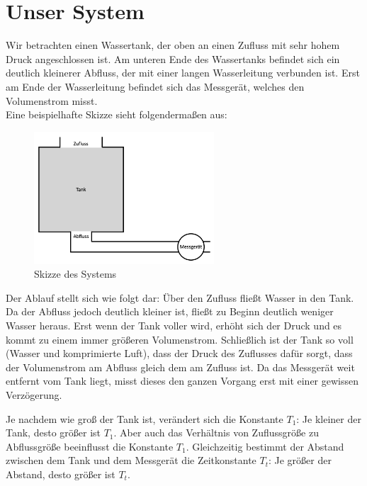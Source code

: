\section{Unser System}
Wir betrachten einen Wassertank, der oben an einen Zufluss mit sehr hohem Druck angeschlossen ist. Am unteren Ende des Wassertanks befindet sich ein deutlich kleinerer Abfluss, der mit einer langen Wasserleitung verbunden ist. Erst am Ende der Wasserleitung befindet sich das Messgerät, welches den Volumenstrom misst. \\
Eine beispielhafte Skizze sieht folgendermaßen aus:
\begin{figure}[H]
    \label{fig:tank}
    \centering
    \includegraphics[width=0.6\textwidth]{Bilder/Tank.png}
    \caption{Skizze des Systems}
 \end{figure}
Der Ablauf stellt sich wie folgt dar: Über den Zufluss fließt Wasser in den Tank. Da der Abfluss jedoch deutlich kleiner ist, fließt zu Beginn deutlich weniger Wasser heraus. Erst wenn der Tank voller wird, erhöht sich der Druck und es kommt zu einem immer größeren Volumenstrom. Schließlich ist der Tank so voll (Wasser und komprimierte Luft), dass der Druck des Zuflusses dafür sorgt, dass der Volumenstrom am Abfluss gleich dem am Zufluss ist. Da das Messgerät weit entfernt vom Tank liegt, misst dieses den ganzen Vorgang erst mit einer gewissen Verzögerung.

Je nachdem wie groß der Tank ist, verändert sich die Konstante $T_1$: Je kleiner der Tank, desto größer ist $T_1$. Aber auch das Verhältnis von Zuflussgröße zu Abflussgröße beeinflusst die Konstante $T_1$. Gleichzeitig bestimmt der Abstand zwischen dem Tank und dem Messgerät die Zeitkonstante $T_t$: Je größer der Abstand, desto größer ist $T_t$.

